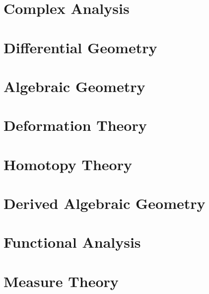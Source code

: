 \documentclass{report}
\begin{document}
\chapter{Complex Analysis}
\renewcommand{\cat}{CA}


\chapter{Differential Geometry}
\renewcommand{\cat}{DG}





\chapter{Algebraic Geometry}
\renewcommand{\cat}{AG}








\chapter{Deformation Theory}
\renewcommand{\cat}{DT}


\chapter{Homotopy Theory}
\renewcommand{\cat}{HT}




\chapter{Derived Algebraic Geometry}
\renewcommand{\cat}{DAG}


\chapter{Functional Analysis}
\renewcommand{\cat}{FA}


\chapter{Measure Theory}
\renewcommand{\cat}{MT}

\end{document}
